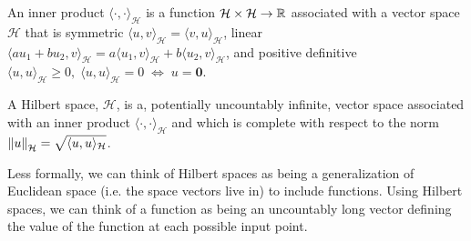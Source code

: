 \begin{definition}{}
	An inner product $\langle\cdot,\cdot\rangle_{\mathcal{H}}$ is a function $\mathcal{H} \times \mathcal{H} \rightarrow \mathbb{R}$ 
	associated with a vector space $\mathcal{H}$
	that is symmetric $\langle u,v\rangle_{\mathcal{H}}=\langle v,u\rangle_{\mathcal{H}}$, linear $\langle a u_1 + b u_2,v\rangle_{\mathcal{H}} = a \langle u_1,v\rangle_{\mathcal{H}} +b\langle u_2,v\rangle_{\mathcal{H}}$, and positive definitive $\langle u,u\rangle_{\mathcal{H}} \ge 0, \; \langle u,u\rangle_{\mathcal{H}} = 0 \; \Leftrightarrow \; u=\mathbf{0}$.
	\label{opt:def:InnerProduce}
\end{definition}
\begin{definition}{}
	A Hilbert space, $\mathcal{H}$, is a, potentially uncountably infinite, vector space associated with an inner product
	$\langle\cdot,\cdot\rangle_{\mathcal{H}}$ and 
	which is complete with respect to the norm $\left\lVert u\right\rVert_{\mathcal{H}} = \sqrt{\langle u,u\rangle_{\mathcal{H}}}$.
	\label{opt:def:HilbertSpace}
\end{definition}
\noindent Less formally, we can think of Hilbert spaces as being a generalization of Euclidean space (i.e. the space vectors live in)
to include functions.  Using Hilbert spaces, we can think of a function as being an uncountably long vector defining
the value of the function at each possible input point.

